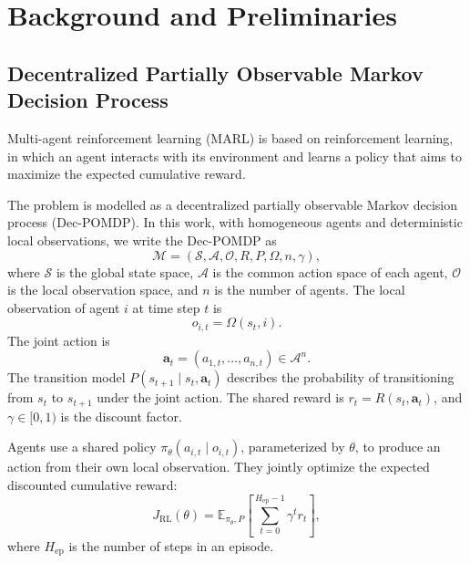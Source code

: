 \documentclass[letterpaper,10pt,conference]{ieeeconf}
\begin{document}

\section{Background and Preliminaries}
\label{sec:background}

\subsection{Decentralized Partially Observable Markov Decision Process}

Multi-agent reinforcement learning (MARL) is based on reinforcement learning,
in which an agent interacts with its environment and learns a policy that
aims to maximize the expected cumulative reward.

The problem is modelled as a decentralized partially observable Markov
decision process (Dec-POMDP). In this work, with homogeneous agents and
deterministic local observations, we write the Dec-POMDP as
\begin{equation}
    \mathcal{M}
    = (\mathcal{S},\mathcal{A},\mathcal{O},R,P,\Omega,n,\gamma),
\end{equation}
where $\mathcal{S}$ is the global state space, $\mathcal{A}$ is the common
action space of each agent, $\mathcal{O}$ is the local observation space,
and $n$ is the number of agents. The local observation of agent $i$ at time
step $t$ is
\begin{equation}
    o_{i,t} = \Omega(s_t,i).
\end{equation}
The joint action is
\begin{equation}
    \mathbf{a}_t = (a_{1,t},\ldots,a_{n,t}) \in \mathcal{A}^{n}.
\end{equation}
The transition model $P(s_{t+1}\mid s_t,\mathbf{a}_t)$ describes the
probability of transitioning from $s_t$ to $s_{t+1}$ under the joint action.
The shared reward is $r_t=R(s_t,\mathbf{a}_t)$, and $\gamma\in[0,1)$ is
the discount factor.

Agents use a shared policy $\pi_\theta(a_{i,t}\mid o_{i,t})$, parameterized
by $\theta$, to produce an action from their own local observation. They
jointly optimize the expected discounted cumulative reward:
\begin{equation}
    J_{\mathrm{RL}}(\theta)
    = \mathbb{E}_{\pi_\theta,P}\!\left[
        \sum_{t=0}^{H_{\mathrm{ep}}-1}\gamma^t r_t
      \right],
    \label{eq:rl-objective}
\end{equation}
where $H_{\mathrm{ep}}$ is the number of steps in an episode.
\end{document}
